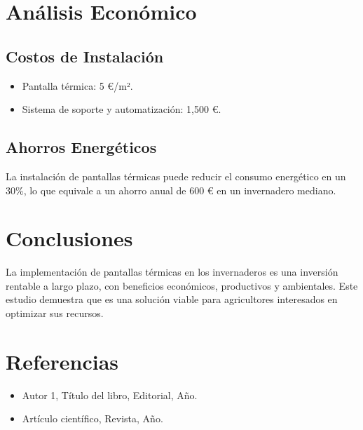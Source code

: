 \begin{Form}
\section{Análisis Económico}
\subsection{Costos de Instalación}
\begin{itemize}
    \item Pantalla térmica: 5 €/m².
    \item Sistema de soporte y automatización: 1,500 €.
\end{itemize}

\subsection{Ahorros Energéticos}
La instalación de pantallas térmicas puede reducir el consumo energético en un 30\%, lo que equivale a un ahorro anual de 600 € en un invernadero mediano.

\section{Conclusiones}
La implementación de pantallas térmicas en los invernaderos es una inversión rentable a largo plazo, con beneficios económicos, productivos y ambientales. Este estudio demuestra que es una solución viable para agricultores interesados en optimizar sus recursos.



















\section{Referencias}
\begin{itemize}
    \item Autor 1, Título del libro, Editorial, Año.
    \item Artículo científico, Revista, Año.
\end{itemize}

\end{Form}

